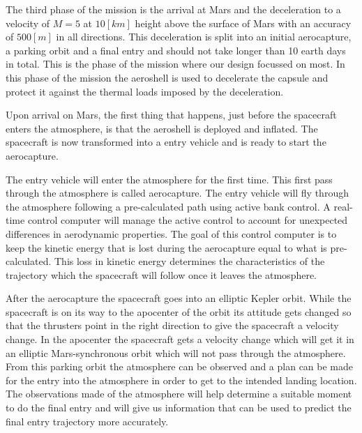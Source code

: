 The third phase of the mission is the arrival at Mars and the deceleration to a velocity of $M=5$ at $10 \left[km\right]$ height above the surface of Mars with an accuracy of $500 \left[m\right]$ in all directions. This deceleration is split into an initial aerocapture, a parking orbit and a final entry and should not take longer than 10 earth days in total. This is the phase of the mission where our design focussed on most. In this phase of the mission the aeroshell is used to decelerate the capsule and protect it against the thermal loads imposed by the deceleration.

Upon arrival on Mars, the first thing that happens, just before the spacecraft enters the atmosphere, is that the aeroshell is deployed and inflated. %
The spacecraft is now transformed into a entry vehicle and is ready to start the aerocapture.

The entry vehicle will enter the atmosphere for the first time. This first pass through the atmosphere is called aerocapture. The entry vehicle will fly through the atmosphere following a pre-calculated path using active bank control. A real-time control computer will manage the active control to account for unexpected differences in aerodynamic properties. The goal of this control computer is to keep the kinetic energy that is lost during the aerocapture equal to what is pre-calculated. This loss in kinetic energy determines the characteristics of the trajectory which the spacecraft will follow once it leaves the atmosphere. %

After the aerocapture the spacecraft goes into an elliptic Kepler orbit. While the spacecraft is on its way to the apocenter of the orbit its attitude gets changed so that the thrusters point in the right direction to give the spacecraft a velocity change. In the apocenter the spacecraft gets a velocity change which will get it in an elliptic Mars-synchronous orbit which will not pass through the atmosphere. From this parking orbit the atmosphere can be observed and a plan can be made for the entry into the atmosphere in order to get to the intended landing location. The observations made of the atmosphere will help determine a suitable moment to do the final entry and will give us information that can be used to predict the final entry trajectory more accurately.

